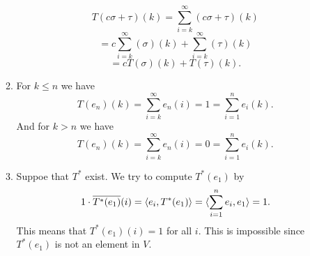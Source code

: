 \begin{enumerate}
\begin{enumerate}
\[T(c\sigma +\tau)(k)=\sum_{i=k}^{\infty}{(c\sigma+\tau)(k)}\]
\[=c\sum_{i=k}^{\infty}{(\sigma)(k)}+\sum_{i=k}^{\infty}{(\tau)(k)}\]
\[=cT(\sigma)(k)+T(\tau)(k).\]
\item For $k\leq n$ we have 
\[T(e_n)(k)=\sum_{i=k}^{\infty}{e_n(i)}=1=\sum_{i=1}^n{e_i}(k).\]
And for $k> n$ we have 
\[T(e_n)(k)=\sum_{i=k}^{\infty}{e_n(i)}=0=\sum_{i=1}^n{e_i}(k).\]
\item Suppoe that $T^*$ exist. We try to compute $T^*(e_1)$ by 
\[1\cdot \overline{T^*(e_1)}(i)=\langle e_i,T^*(e_1)\rangle =\langle \sum_{i=1}^n{e_i},e_1\rangle =1.\]
This means that $T^*(e_1)(i)=1$ for all $i$. This is impossible since $T^*(e_1)$ is not an element in $V$.
\end{enumerate}
\end{enumerate}
